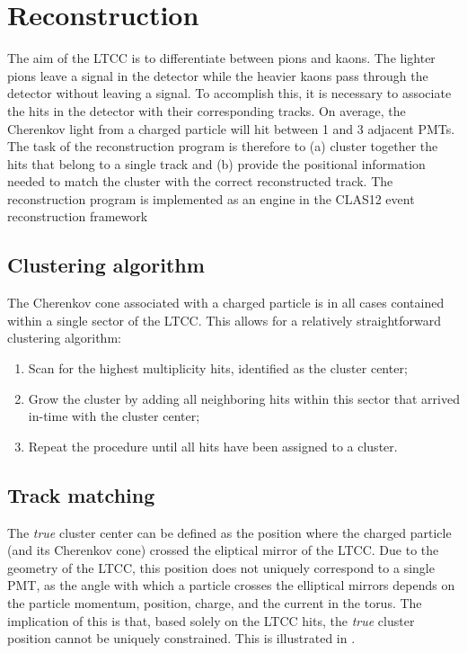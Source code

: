 \section{Reconstruction}

The aim of the LTCC is to differentiate between pions and kaons. The lighter pions
leave a signal in the detector while the heavier kaons pass through the detector without
leaving a signal.
To accomplish this, it is necessary to associate the hits in the detector with their
corresponding tracks.
On average, the Cherenkov light from a charged particle will hit between 1 and 3
adjacent PMTs.
The task of the reconstruction program is therefore to (a) cluster together the hits that
belong to a single track and (b) provide the positional information needed to match the
cluster with the correct reconstructed track.
The reconstruction program is implemented as an engine in the CLAS12 event reconstruction framework \cite{recon-nim}

\subsection{Clustering algorithm}
The Cherenkov cone associated with a charged particle is in all cases contained within a
single sector of the LTCC. This allows for a relatively straightforward clustering
algorithm:
\begin{enumerate}
	\item Scan for the highest multiplicity hits, identified as the cluster center;
    \item Grow the cluster by adding all neighboring hits within this sector that arrived
		  in-time with the cluster center;
    \item Repeat the procedure until all hits have been assigned to a cluster.
\end{enumerate}

\subsection{Track matching}

The \textit{true} cluster center can be defined as the position where the charged particle
(and its Cherenkov cone) crossed the eliptical mirror of the LTCC.
Due to the geometry of the LTCC, this position does not uniquely correspond to a single
PMT, as the angle with which a particle crosses the elliptical mirrors depends on the
particle momentum, position, charge, and the current in the torus.
The implication of this is that, based solely on the LTCC hits, the \textit{true} cluster
position cannot be uniquely constrained.
This is illustrated in .

